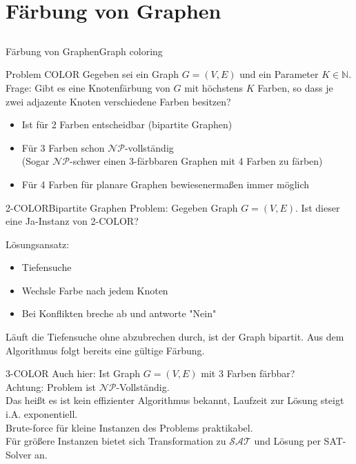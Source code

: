 \section{Färbung von Graphen}
\subsection{}
\begin{frame}{Färbung von Graphen}{Graph coloring}
	\begin{block}{Problem COLOR}
		Gegeben sei ein Graph $G = (V, E)$ und ein Parameter $K \in \mathbb{N}$.
		Frage: Gibt es eine Knotenfärbung von $G$ mit höchstens $K$ Farben,
		so dass je zwei adjazente Knoten verschiedene Farben besitzen?
	\end{block}
	\begin{itemize}
		\item Ist für 2 Farben entscheidbar (bipartite Graphen)
		\item Für 3 Farben schon $\mathcal{NP}$-vollständig \\
			(Sogar $\mathcal{NP}$-schwer einen 3-färbbaren Graphen mit 4 Farben zu färben)
		\item Für 4 Farben für planare Graphen bewiesenermaßen immer möglich
	\end{itemize}
\end{frame}

\begin{frame}{2-COLOR}{Bipartite Graphen}
	Problem: Gegeben Graph $G=(V, E)$. Ist dieser eine Ja-Instanz von 2-COLOR?

	Lösungsansatz:
	\begin{itemize}
		\item Tiefensuche
		\item Wechsle Farbe nach jedem Knoten
		\item Bei Konflikten breche ab und antworte "Nein"
	\end{itemize}
	Läuft die Tiefensuche ohne abzubrechen durch, ist der Graph bipartit. Aus dem Algorithmus folgt bereits eine gültige Färbung.
\end{frame}

\begin{frame}{3-COLOR}
	Auch hier: Ist Graph $G = (V,E)$ mit 3 Farben färbbar? \\
	Achtung: Problem ist $\mathcal{NP}$-Vollständig.
	\\
	Das heißt es ist kein effizienter Algorithmus bekannt, Laufzeit zur Lösung steigt i.A. exponentiell. \\
	Brute-force für kleine Instanzen des Problems praktikabel. \\
	Für größere Instanzen bietet sich Transformation zu $\mathcal{SAT}$ und Lösung per SAT-Solver an.

\end{frame}
